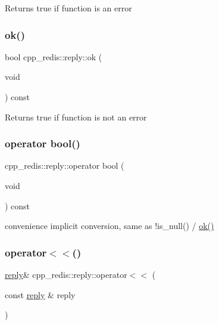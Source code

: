 \begin{DoxyReturn}{Returns}
true if function is an error 
\end{DoxyReturn}
\mbox{\label{classcpp__redis_1_1reply_a1270c4197e0ce79df996565f44011ac0}} 
\subsubsection{\texorpdfstring{ok()}{ok()}}
{\footnotesize\ttfamily bool cpp\+\_\+redis\+::reply\+::ok (\begin{DoxyParamCaption}\item[{void}]{ }\end{DoxyParamCaption}) const}

\begin{DoxyReturn}{Returns}
true if function is not an error 
\end{DoxyReturn}
\mbox{\label{classcpp__redis_1_1reply_a74ef4651c068bfc68436f7e3c7a9a2e6}} 
\subsubsection{\texorpdfstring{operator bool()}{operator bool()}}
{\footnotesize\ttfamily cpp\+\_\+redis\+::reply\+::operator bool (\begin{DoxyParamCaption}\item[{void}]{ }\end{DoxyParamCaption}) const}

convenience implicit conversion, same as !is\+\_\+null() / \hyperlink{classcpp__redis_1_1reply_a1270c4197e0ce79df996565f44011ac0}{ok()} \mbox{\label{classcpp__redis_1_1reply_a4f2a05711b5db6b53108cb9eec4e19be}} 
\subsubsection{\texorpdfstring{operator$<$$<$()}{operator<<()}}
{\footnotesize\ttfamily \hyperlink{classcpp__redis_1_1reply}{reply}\& cpp\+\_\+redis\+::reply\+::operator$<$$<$ (\begin{DoxyParamCaption}\item[{const \hyperlink{classcpp__redis_1_1reply}{reply} \&}]{reply }\end{DoxyParamCaption})}

